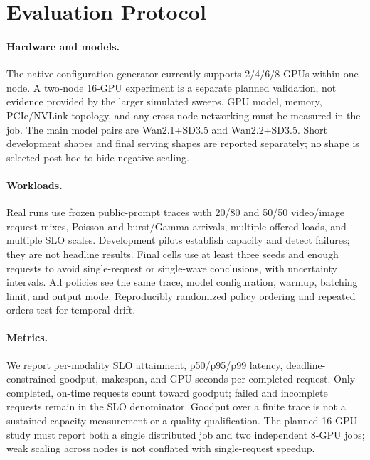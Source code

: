 \documentclass[11pt,a4paper]{article}
\begin{document}
\section{Evaluation Protocol}
\paragraph{Hardware and models.}
The native configuration generator currently supports 2/4/6/8 GPUs within one
node. A two-node 16-GPU experiment is a separate planned validation, not evidence
provided by the larger simulated sweeps. GPU model, memory, PCIe/NVLink topology,
and any cross-node networking must be measured in the job.
The main model pairs are Wan2.1+SD3.5 and
Wan2.2+SD3.5. Short development shapes and final serving shapes are reported
separately; no shape is selected post hoc to hide negative scaling.

\paragraph{Workloads.}
Real runs use frozen public-prompt traces with 20/80 and 50/50 video/image
request mixes, Poisson and burst/Gamma arrivals, multiple offered loads, and
multiple SLO scales. Development pilots establish capacity and detect failures;
they are not headline results. Final cells use at least three seeds and enough
requests to avoid single-request or single-wave conclusions, with uncertainty
intervals. All policies see the same trace, model configuration, warmup,
batching limit, and output mode. Reproducibly randomized policy ordering and
repeated orders test for temporal drift.

\paragraph{Metrics.}
We report per-modality SLO attainment, p50/p95/p99 latency,
deadline-constrained goodput, makespan, and GPU-seconds per completed request.
Only completed, on-time requests count toward goodput; failed and incomplete
requests remain in the SLO denominator. Goodput over a finite trace is not a
sustained capacity measurement or a quality qualification.
The planned 16-GPU study must report both a single distributed job and two independent
8-GPU jobs; weak scaling across nodes is not conflated with single-request
speedup.
\end{document}
